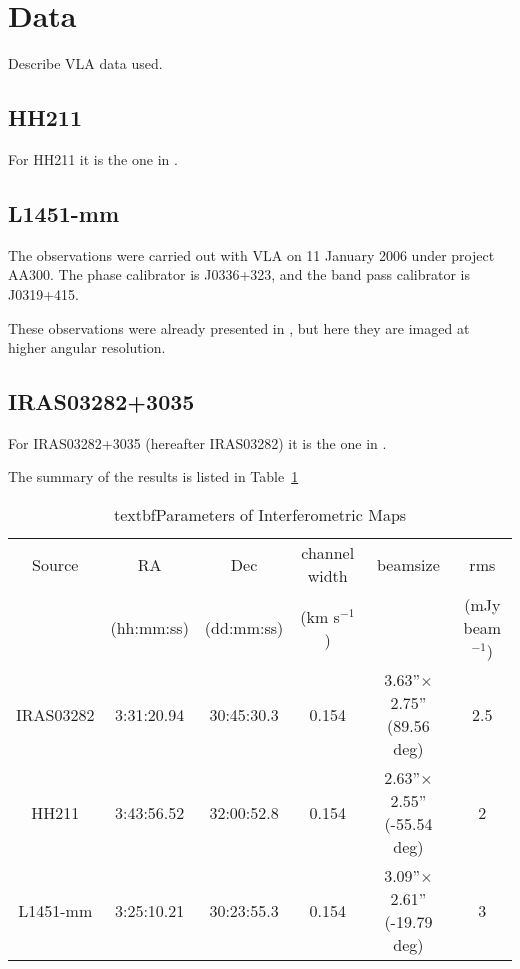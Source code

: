 \section{Data}

Describe VLA data used.

\subsection{HH211}
For HH211 it is the one in \cite{Tanner_2010}.


\subsection{L1451-mm}
The observations were carried out with VLA on 11 January 2006 under project AA300. 
The phase calibrator is J0336+323, and the band pass calibrator is J0319+415.

These observations were already presented in \cite{Pineda_2011}, but here they are 
imaged at higher angular resolution.

\subsection{IRAS03282+3035}
For IRAS03282+3035 (hereafter IRAS03282) it is the one in \cite{Tobin_2011}. 

The summary of the results is listed in Table~\ref{table:obs}

\begin{table} 
\label{table:obs}
    \begin{tabular}{ c c c c c c }
        Source & RA & Dec & channel width & beamsize & rms \\ 
         & (hh:mm:ss) & (dd:mm:ss) & (km s$^{-1}$) &  & (mJy beam$^{-1}$) \\ 
        IRAS03282 & 3:31:20.94 & 30:45:30.3 & 0.154 & 3.63''$\times$2.75'' (89.56  deg) & 2.5 \\ 
        HH211 & 3:43:56.52 & 32:00:52.8 & 0.154 & 2.63''$\times$2.55'' (-55.54 deg) & 2 \\ 
        L1451-mm & 3:25:10.21 & 30:23:55.3 & 0.154 & 3.09''$\times$2.61'' (-19.79 deg) & 3 \\ 
    \end{tabular} 
    \caption {textbf{Parameters of Interferometric Maps}}
\end{table}
  
  
  
  
  
  
  
  
  
  
  
  
  
  
  
  
  
  
  
  
  